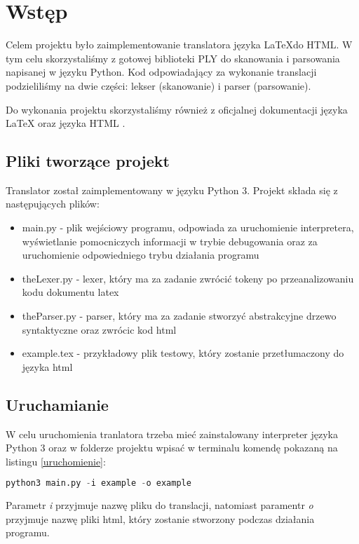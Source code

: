 \chapter{Wstęp}

Celem projektu było zaimplementowanie translatora języka \LaTeX \space do HTML. W tym celu skorzystaliśmy z gotowej
biblioteki PLY \cite{ply} do skanowania i parsowania napisanej w języku Python. Kod odpowiadający za wykonanie translacji 
podzieliliśmy na dwie części: lekser (skanowanie) i parser (parsowanie). 

Do wykonania projektu skorzystaliśmy również z oficjalnej dokumentacji języka \LaTeX \space \cite{overleaf} 
oraz języka HTML \cite{html}.

\section{Pliki tworzące projekt}
Translator został zaimplementowany w języku Python 3.
Projekt składa się z następujących plików:
\begin{itemize}
    \item main.py - plik wejściowy programu, odpowiada za uruchomienie interpretera, wyświetlanie pomocniczych informacji w trybie debugowania
        oraz za uruchomienie odpowiedniego trybu działania programu
    \item theLexer.py - lexer, który ma za zadanie zwrócić tokeny po przeanalizowaniu kodu dokumentu latex
    \item theParser.py - parser, który ma za zadanie stworzyć abstrakcyjne drzewo syntaktyczne oraz zwrócic kod html
    \item example.tex - przykładowy plik testowy, który zostanie przetłumaczony do języka html
\end{itemize}

\section{Uruchamianie}
W celu uruchomienia tranlatora trzeba mieć zainstalowany interpreter języka Python 3 oraz 
w folderze projektu wpisać w terminalu komendę pokazaną na listingu \ref{uruchomienie}:
\begin{lstlisting}[language={Python}, caption={Uruchomienie}, label={uruchomienie}]
    python3 main.py -i example -o example
\end{lstlisting}

Parametr \textit{i} przyjmuje nazwę pliku do translacji, natomiast paramentr \textit{o} przyjmuje nazwę pliki html, który
zostanie stworzony podczas działania programu.